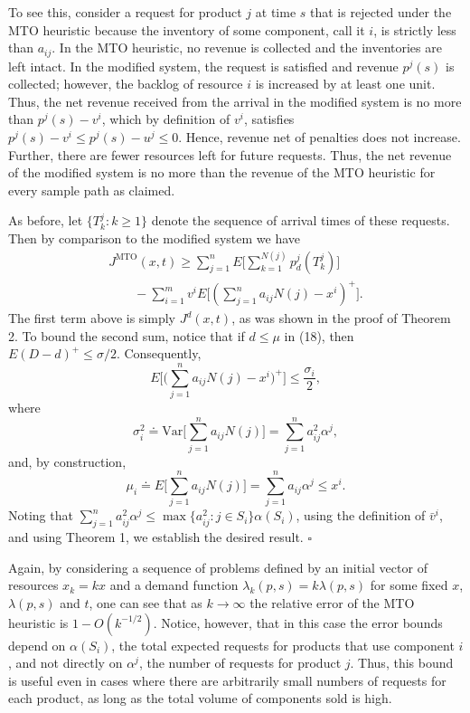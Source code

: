 To see this, consider a request for product \(j\) at time \(s\) that is rejected under the MTO heuristic because the inventory of some component, call it \(i\), is strictly less than \(a_{ij}\). In the MTO heuristic, no revenue is collected and the inventories are left intact. In the modified system, the request is satisfied and revenue \(p^j(s)\) is collected; however, the backlog of resource \(i\) is increased by at least one unit. Thus, the net revenue received from the arrival in the modified system is no more than \(p^j(s) - v^i\), which by definition of \(v^i\), satisfies \(p^j(s) - v^i \leqslant p^j(s) - u^j \leqslant 0\). Hence, revenue net of penalties does not increase. Further, there are fewer resources left for future requests. Thus, the net revenue of the modified system is no more than the revenue of the MTO heuristic for every sample path as claimed.

As before, let \(\{ T_k^j \colon k \geqslant 1 \}\) denote the sequence of arrival times of these requests. Then by comparison to the modified system we have
\[
\begin{array}{c}
\displaystyle J^{\mathrm{MTO}}(x, t) \geqslant \sum_{j=1}^{n} E \Bigg[ \sum_{k=1}^{N(j)} p_d^j(T_k^j) \Bigg] \\
\displaystyle \qquad - \sum_{i=1}^{m} v^i E \Bigg[ \left( \sum_{j=1}^{n} a_{ij} N(j) - x^i \right)^{+} \Bigg] .
\end{array}
\]
The first term above is simply \(J^{d}(x, t)\), as was shown in the proof of Theorem 2. To bound the second sum, notice that if \(d \leqslant \mu\) in (18), then \(E(D - d)^{+} \leqslant \sigma / 2\). Consequently,
\[
E \Bigg[ \Bigg( \sum_{j=1}^{n} a_{ij} N(j) - x^i \Bigg)^{+} \Bigg] \leqslant \frac{\sigma_i}{2} ,
\]
where
\[
\sigma_i^{2} \doteq \mathrm{Var} \biggl[ \sum_{j=1}^{n} a_{ij} N(j) \biggr] = \sum_{j=1}^{n} a_{ij}^{2} \alpha^j ,
\]
and, by construction,
\[
\mu_i \doteq E \biggl[ \sum_{j=1}^{n} a_{ij} N(j) \biggr] = \sum_{j=1}^{n} a_{ij} \alpha^j \leqslant x^i .
\]
Noting that \(\sum_{j=1}^{n} a_{ij}^{2} \alpha^j \leqslant \operatorname*{max} \{ a_{ij}^2 \colon j \in S_i \} \alpha(S_i)\), using the definition of \(\bar{v}^i\), and using Theorem 1, we establish the desired result. \(\square\)

Again, by considering a sequence of problems defined by an initial vector of resources \(x_k = k x\) and a demand function \(\lambda_k(p, s) = k \lambda(p, s)\) for some fixed \(x\), \(\lambda(p, s)\) and \(t\), one can see that as \(k \to \infty\) the relative error of the MTO heuristic is \(1 - O(k^{-1/2})\). Notice, however, that in this case the error bounds depend on \(\alpha(S_i)\), the total expected requests for products that use component \(i\), and not directly on \(\alpha^j\), the number of requests for product \(j\). Thus, this bound is useful even in cases where there are arbitrarily small numbers of requests for each product, as long as the total volume of components sold is high.


